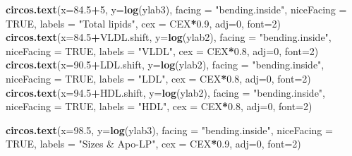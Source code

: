 \documentclass[
]{article}
\newenvironment{Shaded}{\begin{snugshade}}{\end{snugshade}}
\newcommand{\DataTypeTok}[1]{\textcolor[rgb]{0.13,0.29,0.53}{#1}}
\newcommand{\DecValTok}[1]{\textcolor[rgb]{0.00,0.00,0.81}{#1}}
\newcommand{\FloatTok}[1]{\textcolor[rgb]{0.00,0.00,0.81}{#1}}
\newcommand{\KeywordTok}[1]{\textcolor[rgb]{0.13,0.29,0.53}{\textbf{#1}}}
\newcommand{\NormalTok}[1]{#1}
\newcommand{\OperatorTok}[1]{\textcolor[rgb]{0.81,0.36,0.00}{\textbf{#1}}}
\newcommand{\OtherTok}[1]{\textcolor[rgb]{0.56,0.35,0.01}{#1}}
\newcommand{\StringTok}[1]{\textcolor[rgb]{0.31,0.60,0.02}{#1}}
\begin{document}
\begin{Shaded}
\begin{Highlighting}[]
\KeywordTok{circos.text}\NormalTok{(}\DataTypeTok{x=}\FloatTok{84.5}\OperatorTok{+}\DecValTok{5}\NormalTok{, }\DataTypeTok{y=}\KeywordTok{log}\NormalTok{(ylab3), }\DataTypeTok{facing =} \StringTok{"bending.inside"}\NormalTok{, }\DataTypeTok{niceFacing =} \OtherTok{TRUE}\NormalTok{, }\DataTypeTok{labels =} \StringTok{"Total lipids"}\NormalTok{, }\DataTypeTok{cex =}\NormalTok{ CEX}\OperatorTok{*}\FloatTok{0.9}\NormalTok{, }\DataTypeTok{adj=}\DecValTok{0}\NormalTok{, }\DataTypeTok{font=}\DecValTok{2}\NormalTok{)}
\KeywordTok{circos.text}\NormalTok{(}\DataTypeTok{x=}\FloatTok{84.5}\OperatorTok{+}\NormalTok{VLDL.shift, }\DataTypeTok{y=}\KeywordTok{log}\NormalTok{(ylab2), }\DataTypeTok{facing =} \StringTok{"bending.inside"}\NormalTok{, }\DataTypeTok{niceFacing =} \OtherTok{TRUE}\NormalTok{, }\DataTypeTok{labels =} \StringTok{"VLDL"}\NormalTok{, }\DataTypeTok{cex =}\NormalTok{ CEX}\OperatorTok{*}\FloatTok{0.8}\NormalTok{, }\DataTypeTok{adj=}\DecValTok{0}\NormalTok{, }\DataTypeTok{font=}\DecValTok{2}\NormalTok{)}
\KeywordTok{circos.text}\NormalTok{(}\DataTypeTok{x=}\FloatTok{90.5}\OperatorTok{+}\NormalTok{LDL.shift, }\DataTypeTok{y=}\KeywordTok{log}\NormalTok{(ylab2), }\DataTypeTok{facing =} \StringTok{"bending.inside"}\NormalTok{, }\DataTypeTok{niceFacing =} \OtherTok{TRUE}\NormalTok{, }\DataTypeTok{labels =} \StringTok{"LDL"}\NormalTok{, }\DataTypeTok{cex =}\NormalTok{ CEX}\OperatorTok{*}\FloatTok{0.8}\NormalTok{, }\DataTypeTok{adj=}\DecValTok{0}\NormalTok{, }\DataTypeTok{font=}\DecValTok{2}\NormalTok{)}
\KeywordTok{circos.text}\NormalTok{(}\DataTypeTok{x=}\FloatTok{94.5}\OperatorTok{+}\NormalTok{HDL.shift, }\DataTypeTok{y=}\KeywordTok{log}\NormalTok{(ylab2), }\DataTypeTok{facing =} \StringTok{"bending.inside"}\NormalTok{, }\DataTypeTok{niceFacing =} \OtherTok{TRUE}\NormalTok{, }\DataTypeTok{labels =} \StringTok{"HDL"}\NormalTok{, }\DataTypeTok{cex =}\NormalTok{ CEX}\OperatorTok{*}\FloatTok{0.8}\NormalTok{, }\DataTypeTok{adj=}\DecValTok{0}\NormalTok{, }\DataTypeTok{font=}\DecValTok{2}\NormalTok{) }

\KeywordTok{circos.text}\NormalTok{(}\DataTypeTok{x=}\FloatTok{98.5}\NormalTok{, }\DataTypeTok{y=}\KeywordTok{log}\NormalTok{(ylab3), }\DataTypeTok{facing =} \StringTok{"bending.inside"}\NormalTok{, }\DataTypeTok{niceFacing =} \OtherTok{TRUE}\NormalTok{, }\DataTypeTok{labels =} \StringTok{"Sizes & Apo-LP"}\NormalTok{, }\DataTypeTok{cex =}\NormalTok{ CEX}\OperatorTok{*}\FloatTok{0.9}\NormalTok{, }\DataTypeTok{adj=}\DecValTok{0}\NormalTok{, }\DataTypeTok{font=}\DecValTok{2}\NormalTok{)}


\end{Highlighting}
\end{Shaded}
\end{document}
